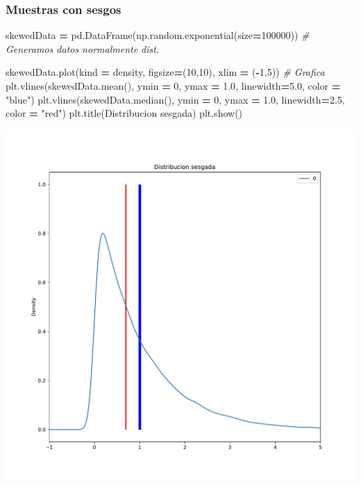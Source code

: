 \documentclass[
]{article}
\newenvironment{Shaded}{\begin{snugshade}}{\end{snugshade}}
\newcommand{\CommentTok}[1]{\textcolor[rgb]{0.56,0.35,0.01}{\textit{#1}}}
\newcommand{\DecValTok}[1]{\textcolor[rgb]{0.00,0.00,0.81}{#1}}
\newcommand{\FloatTok}[1]{\textcolor[rgb]{0.00,0.00,0.81}{#1}}
\newcommand{\NormalTok}[1]{#1}
\newcommand{\OperatorTok}[1]{\textcolor[rgb]{0.81,0.36,0.00}{\textbf{#1}}}
\newcommand{\StringTok}[1]{\textcolor[rgb]{0.31,0.60,0.02}{#1}}
\begin{document}
\hypertarget{muestras-con-sesgos}{%
\subsubsection{Muestras con sesgos}\label{muestras-con-sesgos}}

\begin{Shaded}
\begin{Highlighting}[]
\NormalTok{skewedData }\OperatorTok{=}\NormalTok{ pd.DataFrame(np.random.exponential(size}\OperatorTok{=}\DecValTok{100000}\NormalTok{)) }\CommentTok{\# Generamos datos normalmente dist.}

\NormalTok{skewedData.plot(kind }\OperatorTok{=} \StringTok{\textquotesingle{}density\textquotesingle{}}\NormalTok{, figsize}\OperatorTok{=}\NormalTok{(}\DecValTok{10}\NormalTok{,}\DecValTok{10}\NormalTok{), xlim }\OperatorTok{=}\NormalTok{ (}\OperatorTok{{-}}\DecValTok{1}\NormalTok{,}\DecValTok{5}\NormalTok{)) }\CommentTok{\# Grafica}
\NormalTok{plt.vlines(skewedData.mean(), ymin }\OperatorTok{=} \DecValTok{0}\NormalTok{, ymax }\OperatorTok{=} \FloatTok{1.0}\NormalTok{,}
\NormalTok{linewidth}\OperatorTok{=}\FloatTok{5.0}\NormalTok{, color }\OperatorTok{=} \StringTok{"blue"}\NormalTok{)}
\NormalTok{plt.vlines(skewedData.median(), ymin }\OperatorTok{=} \DecValTok{0}\NormalTok{, ymax }\OperatorTok{=} \FloatTok{1.0}\NormalTok{,}
\NormalTok{linewidth}\OperatorTok{=}\FloatTok{2.5}\NormalTok{, color }\OperatorTok{=} \StringTok{"red"}\NormalTok{)}
\NormalTok{plt.title(}\StringTok{\textquotesingle{}Distribucion sesgada\textquotesingle{}}\NormalTok{)}
\NormalTok{plt.show()}
\end{Highlighting}
\end{Shaded}

\begin{center}\includegraphics{Ejercicio-de-los-Carros_files/figure-latex/unnamed-chunk-5-3} \end{center}
\end{document}
